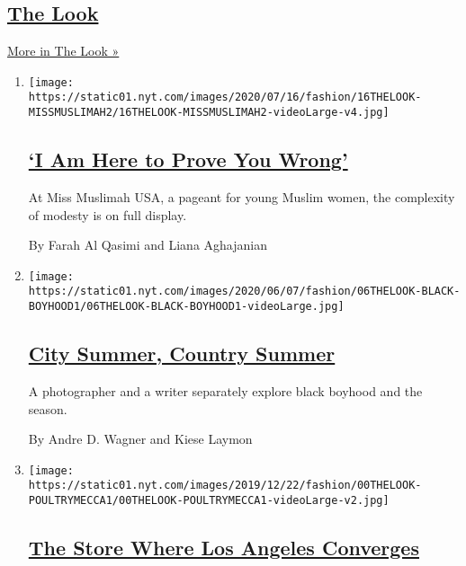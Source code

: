 \hypertarget{the-look}{%
\subsection{\texorpdfstring{\href{/column/the-look}{The
Look}}{The Look}}\label{the-look}}

\href{/column/the-look}{More in The Look »}

\begin{enumerate}
\def\labelenumi{\arabic{enumi}.}
\item
  \texttt{[image: https://static01.nyt.com/images/2020/07/16/fashion/16THELOOK-MISSMUSLIMAH2/16THELOOK-MISSMUSLIMAH2-videoLarge-v4.jpg]}

  \hypertarget{i-am-here-to-prove-you-wrong}{%
  \subsection{\texorpdfstring{\href{/2020/07/04/style/muslim-beauty-pageant-miss-muslimah-usa.html}{`I
  Am Here to Prove You
  Wrong'}}{`I Am Here to Prove You Wrong'}}\label{i-am-here-to-prove-you-wrong}}

  At Miss Muslimah USA, a pageant for young Muslim women, the complexity
  of modesty is on full display.

  By Farah Al Qasimi and Liana Aghajanian
\item
  \texttt{[image: https://static01.nyt.com/images/2020/06/07/fashion/06THELOOK-BLACK-BOYHOOD1/06THELOOK-BLACK-BOYHOOD1-videoLarge.jpg]}

  \hypertarget{city-summer-country-summer}{%
  \subsection{\texorpdfstring{\href{/2020/06/06/style/city-summer-country-summer.html}{City
  Summer, Country
  Summer}}{City Summer, Country Summer}}\label{city-summer-country-summer}}

  A photographer and a writer separately explore black boyhood and the
  season.

  By Andre D. Wagner and Kiese Laymon
\item
  \texttt{[image: https://static01.nyt.com/images/2019/12/22/fashion/00THELOOK-POULTRYMECCA1/00THELOOK-POULTRYMECCA1-videoLarge-v2.jpg]}

  \hypertarget{the-store-where-los-angeles-converges}{%
  \subsection{\texorpdfstring{\href{/2019/12/21/style/la-fresh-poultry-immigrant-family-recipes.html}{The
  Store Where Los Angeles
  Converges}}{The Store Where Los Angeles Converges}}\label{the-store-where-los-angeles-converges}}


\end{enumerate}
